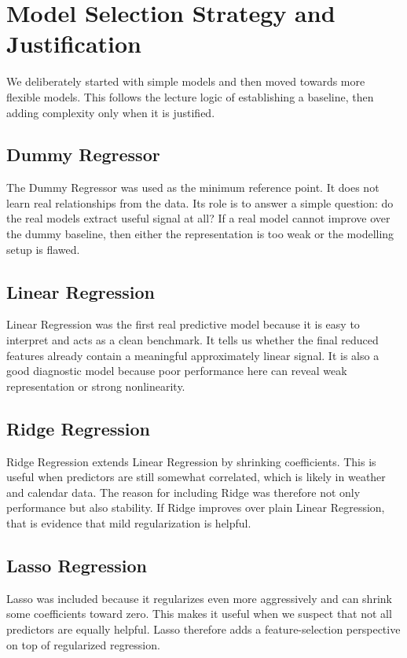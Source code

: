 \documentclass[conference]{IEEEtran}
\begin{document}
\section{Model Selection Strategy and Justification}
We deliberately started with simple models and then moved towards more flexible models. This follows 
the lecture logic of establishing a baseline, then adding complexity only when it is justified.

\subsection{Dummy Regressor}
The Dummy Regressor was used as the minimum reference point. It does not learn real relationships 
from the data. Its role is to answer a simple question: do the real models extract useful signal at 
all? If a real model cannot improve over the dummy baseline, then either the representation is too 
weak or the modelling setup is flawed.

\subsection{Linear Regression}
Linear Regression was the first real predictive model because it is easy to interpret and acts as a 
clean benchmark. It tells us whether the final reduced features already contain a meaningful 
approximately linear signal. It is also a good diagnostic model because poor performance here can 
reveal weak representation or strong nonlinearity.

\subsection{Ridge Regression}
Ridge Regression extends Linear Regression by shrinking coefficients. This is useful when predictors 
are still somewhat correlated, which is likely in weather and calendar data. The reason for including 
Ridge was therefore not only performance but also stability. If Ridge improves over plain Linear 
Regression, that is evidence that mild regularization is helpful.

\subsection{Lasso Regression}
Lasso was included because it regularizes even more aggressively and can shrink some coefficients 
toward zero. This makes it useful when we suspect that not all predictors are equally helpful. Lasso 
therefore adds a feature-selection perspective on top of regularized regression.
\end{document}
